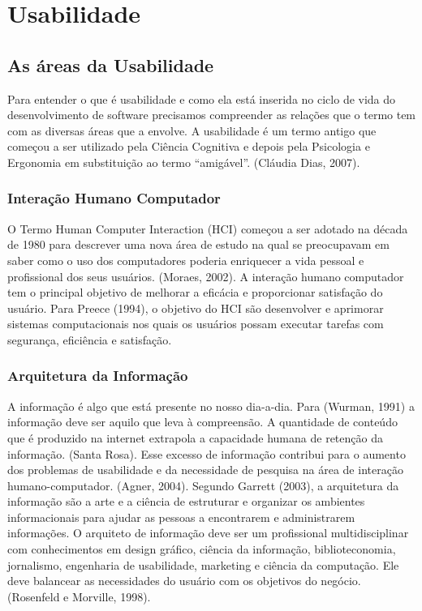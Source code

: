 \chapter{Usabilidade}

\section{As áreas da Usabilidade}

	Para entender o que é usabilidade e como ela está inserida no ciclo de vida do desenvolvimento de software precisamos compreender as relações que o termo tem com as diversas áreas que a envolve.
	A usabilidade é um termo antigo que começou a ser utilizado pela Ciência Cognitiva e depois pela Psicologia e Ergonomia em substituição ao termo “amigável”. (Cláudia Dias, 2007). 

\subsection{Interação Humano Computador}

	O Termo Human Computer Interaction  (HCI) começou a ser adotado na década de 1980 para descrever uma nova área de estudo na qual se preocupavam em saber como o uso dos computadores poderia enriquecer a vida pessoal e profissional dos seus usuários. (Moraes, 2002). 
	A interação humano computador tem o principal objetivo de melhorar a eficácia e proporcionar satisfação do usuário. Para Preece (1994), o objetivo do HCI são desenvolver e aprimorar sistemas computacionais nos quais os usuários possam executar tarefas com segurança, eficiência e satisfação.

	
\subsection{Arquitetura da Informação}

A informação é algo que está presente no nosso dia-a-dia. Para (Wurman, 1991) a informação deve ser aquilo que leva à compreensão. A quantidade de conteúdo que é produzido na internet extrapola a capacidade humana de retenção da informação. (Santa Rosa). Esse excesso de informação contribui para o aumento dos problemas de usabilidade e da necessidade de pesquisa na área de interação humano-computador. (Agner, 2004).
Segundo Garrett (2003), a arquitetura da informação são a arte e a ciência de estruturar e organizar os ambientes informacionais para ajudar as pessoas a encontrarem e administrarem informações.
O arquiteto de informação deve ser um profissional multidisciplinar com conhecimentos em design gráfico, ciência da informação, biblioteconomia, jornalismo, engenharia de usabilidade, marketing e ciência da computação. Ele deve balancear as necessidades do usuário com os objetivos do negócio. (Rosenfeld e Morville, 1998).


